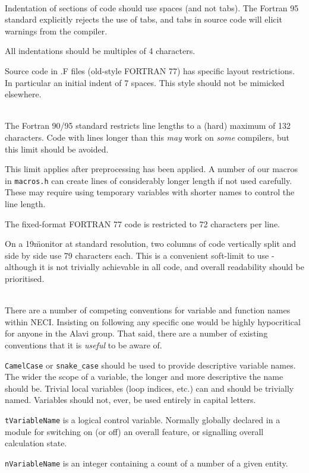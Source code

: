 \documentclass[a4paper,notitlepage]{scrreprt}
\newenvironment{packed_itemize}{
	\begin{itemize}
		\setlength{\itemsep}{1pt}
		\setlength{\parskip}{0pt}
		\setlength{\parsep}{0pt}
	}{\end{itemize}}
\newcommand\headitem[1]{\needspace{1.5\baselineskip}\item[{\boldmath #1 \nopagebreak}] \hfill \\ \nopagebreak}
\let\code\lstinline
\begin{document}
\begin{description}
	\headitem{Indentation}
		Indentation of sections of code should use spaces (and not tabs). The
		Fortran 95 standard explicitly rejects the use of tabs, and tabs in
		source code will elicit warnings from the compiler.

		All indentations should be multiples of 4 characters.

		Source code in \textasteriskcentered.F files (old-style FORTRAN 77)
		has specific layout restrictions. In particular an initial indent of
		7 spaces. This style should not be mimicked elsewhere.

	\headitem{Code line length}
		The Fortran 90/95 standard restricts line lengths to a (hard) maximum
		of 132 characters. Code with lines longer than this \emph{may} work
		on \emph{some} compilers, but this limit should be avoided.

		This limit applies after preprocessing has been applied. A number of
		our macros in \code{macros.h} can create lines of considerably
		longer length if not used carefully. These may require using temporary
		variables with shorter names to control the line length.

		The fixed-format FORTRAN 77 code is restricted to 72 characters per
		line.

		On a 19\" monitor at standard resolution, two columns of code
		vertically split and side by side use 79 characters each. This is a
		convenient soft-limit to use - although it is not trivially achievable
		in all code, and overall readability should be prioritised.

	\headitem{Variable name conventions}
		There are a number of competing conventions for variable and function
		names within NECI. Insisting on following any specific one would be
		highly hypocritical for anyone in the Alavi group. That said, there
		are a number of existing conventions that it is \emph{useful} to be
		aware of.
		\begin{packed_itemize}
			\item
				\code{CamelCase} or \code{snake_case} should be used
				to provide descriptive variable names. The wider the scope of
				a variable, the longer and more descriptive the name should be.
				Trivial local variables (loop indices, etc.) can and should be
				trivially named. Variables should not, ever, be used entirely
				in capital letters.
			\item
				\code{tVariableName} is a logical control variable.
				Normally globally declared in a module for switching on (or
				off) an overall feature, or signalling overall calculation
				state.
			\item
				\code{nVariableName} is an integer containing a count of
				a number of a given entity.


\end{packed_itemize}
\end{description}
\end{document}

